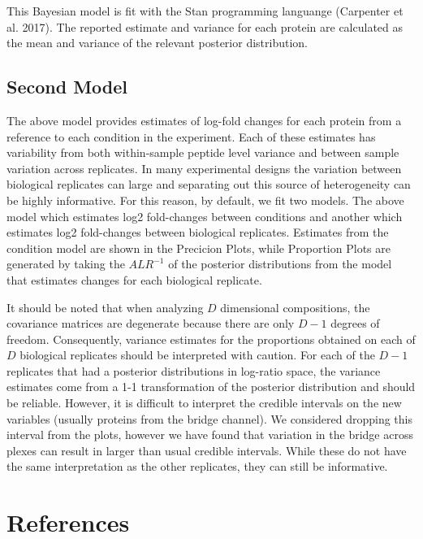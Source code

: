 \documentclass[]{article}
\begin{document}
This Bayesian model is fit with the Stan programming languange
(Carpenter et al. 2017). The reported estimate and variance for each
protein are calculated as the mean and variance of the relevant
posterior distribution.

\subsection{Second Model}\label{second-model}

The above model provides estimates of log-fold changes for each protein
from a reference to each condition in the experiment. Each of these
estimates has variability from both within-sample peptide level variance
and between sample variation across replicates. In many experimental
designs the variation between biological replicates can large and
separating out this source of heterogeneity can be highly informative.
For this reason, by default, we fit two models. The above model which
estimates log2 fold-changes between conditions and another which
estimates log2 fold-changes between biological replicates. Estimates
from the condition model are shown in the Precicion Plots, while
Proportion Plots are generated by taking the \(ALR^{-1}\) of the
posterior distributions from the model that estimates changes for each
biological replicate.

It should be noted that when analyzing \(D\) dimensional compositions,
the covariance matrices are degenerate because there are only \(D-1\)
degrees of freedom. Consequently, variance estimates for the proportions
obtained on each of \(D\) biological replicates should be interpreted
with caution. For each of the \(D-1\) replicates that had a posterior
distributions in log-ratio space, the variance estimates come from a 1-1
transformation of the posterior distribution and should be reliable.
However, it is difficult to interpret the credible intervals on the new
variables (usually proteins from the bridge channel). We considered
dropping this interval from the plots, however we have found that
variation in the bridge across plexes can result in larger than usual
credible intervals. While these do not have the same interpretation as
the other replicates, they can still be informative.

\section*{References}\label{references}
\end{document}
